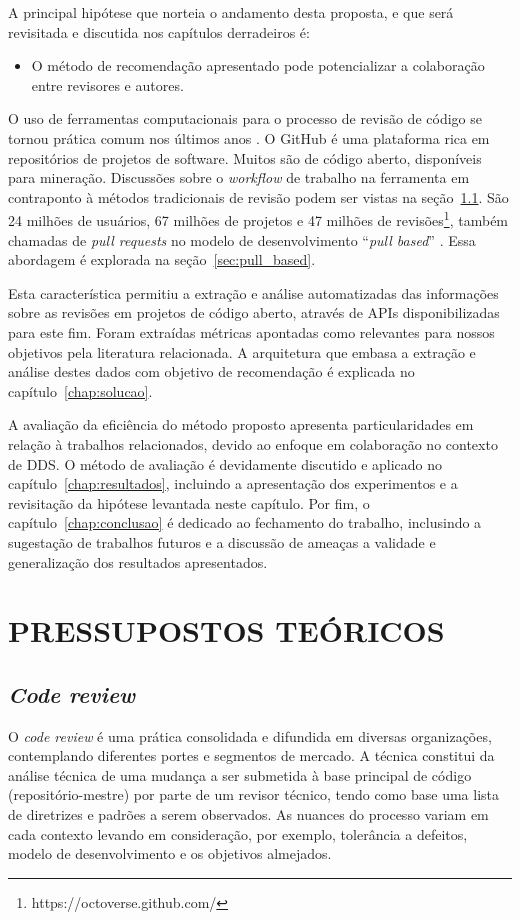 \documentclass[12pt,openany,oneside,a4paper,english,brazil]{abntbibufjf}
\begin{document}
  A principal hipótese que norteia o andamento desta proposta, e que será revisitada e discutida nos capítulos derradeiros é:

  \begin{itemize}
    \item O método de recomendação apresentado pode potencializar a colaboração entre revisores e autores.
  \end{itemize}

  O uso de ferramentas computacionais para o processo de revisão de código se tornou prática comum nos últimos anos \cite{Bacchelli2013}. O GitHub é uma plataforma rica em repositórios de projetos de software. Muitos são de código aberto, disponíveis para mineração. Discussões sobre o \textit{workflow} de trabalho na ferramenta em contraponto à métodos tradicionais de revisão podem ser vistas na seção~\ref{sec:code_review}. São 24 milhões de usuários, 67 milhões de projetos e 47 milhões de revisões\footnote{https://octoverse.github.com/}, também chamadas de \textit{pull requests} no modelo de desenvolvimento ``\textit{pull based}'' \cite{gousios2014}. Essa abordagem é explorada na seção~\ref{sec:pull_based}.

  Esta característica permitiu a extração e análise automatizadas das informações sobre as revisões em projetos de código aberto, através de APIs disponibilizadas para este fim. Foram extraídas métricas apontadas como relevantes para nossos objetivos pela literatura relacionada. A arquitetura que embasa a extração e análise destes dados com objetivo de recomendação é explicada no capítulo~\ref{chap:solucao}.

  A avaliação da eficiência do método proposto apresenta particularidades em relação à trabalhos relacionados, devido ao enfoque em colaboração no contexto de DDS. O método de avaliação é devidamente discutido e aplicado no capítulo~\ref{chap:resultados}, incluindo a apresentação dos experimentos e a revisitação da hipótese levantada neste capítulo. Por fim, o capítulo~\ref{chap:conclusao} é dedicado ao fechamento do trabalho, inclusindo a sugestação de trabalhos futuros e a discussão de ameaças a validade e generalização dos resultados apresentados.


\chapter{PRESSUPOSTOS TEÓRICOS}\label{chap:metodos}

  \section{\textit{Code review}}\label{sec:code_review}
    O \textit{code review} é uma prática consolidada e difundida em diversas organizações, contemplando diferentes portes e segmentos de mercado. A técnica constitui da análise técnica de uma mudança a ser submetida à base principal de código (repositório-mestre) por parte de um revisor técnico, tendo como base uma lista de diretrizes e padrões a serem observados. As nuances do processo variam em cada contexto levando em consideração, por exemplo, tolerância a defeitos, modelo de desenvolvimento e os objetivos almejados.
\end{document}
